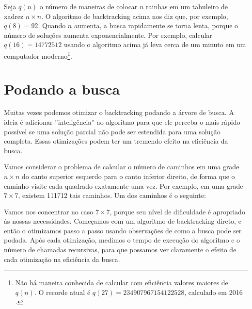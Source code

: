 Seja $q(n)$ o número de maneiras
de colocar $n$ rainhas em um tabuleiro de xadrez $n \times n$.
O algoritmo de backtracking acima nos diz que, por exemplo, $q(8)=92$.
Quando $n$ aumenta, a busca rapidamente se torna lenta,
porque o número de soluções aumenta
exponencialmente.
Por exemplo, calcular $q(16)=14772512$
usando o algoritmo acima já leva cerca de um minuto
em um computador moderno\footnote{Não há maneira conhecida de calcular com eficiência
valores maiores de $q(n)$. O recorde atual é
$q(27)=234907967154122528$, calculado em 2016 \cite{q27}.}.

\section{Podando a busca}

Muitas vezes podemos otimizar o backtracking
podando a árvore de busca.
A ideia é adicionar ''inteligência'' ao algoritmo
para que ele perceba o mais rápido possível
se uma solução parcial não pode ser estendida
para uma solução completa.
Essas otimizações podem ter um tremendo
efeito na eficiência da busca.

Vamos considerar o problema
de calcular o número de caminhos
em uma grade $n \times n$ do canto superior esquerdo
para o canto inferior direito, de forma que o
caminho visite cada quadrado exatamente uma vez.
Por exemplo, em uma grade $7 \times 7$,
existem 111712 tais caminhos.
Um dos caminhos é o seguinte:

\begin{center}
\end{center}

Vamos nos concentrar no caso $7 \times 7$,
porque seu nível de dificuldade é apropriado às nossas necessidades.
Começamos com um algoritmo de backtracking direto,
e então o otimizamos passo a passo usando observações
de como a busca pode ser podada.
Após cada otimização, medimos o tempo de execução
do algoritmo e o número de chamadas recursivas,
para que possamos ver claramente o efeito de cada
otimização na eficiência da busca.


